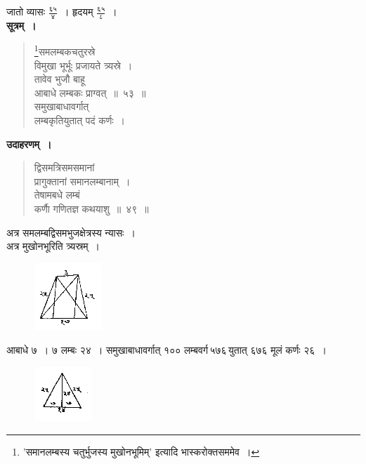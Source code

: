 \documentclass[11pt, openany]{book}
\begin{document}
 जातो व्यासः $\frac{\mbox{६५}}{\mbox{४}}$~। हृदयम् 
 $\frac{\mbox{६५}}{\mbox{८}}$~। \\

 \textbf{सूत्रम्~।} 
\setcounter{footnote}{0}
 \begin{quote}
     \bs 
      \footnote{'{\color{violet}समानलम्बस्य चतुर्भुजस्य मुखोनभूमिम्}' इत्यादि {\color{violet}भास्करो}क्तसममेव~।}समलम्बकचतुरस्रे \\
      विमुखा भूर्भूः प्रजायते त्र्यस्रे~।\\
तावेव भुजौ बाहू \\
आबाधे लम्बकः प्राग्वत्~॥~५३~॥\\
समुखाबाधावर्गात्\\
लम्बकृतियुतात् पदं कर्णः~।\\
 \end{quote}
\newpage%
 \textbf{उदाहरणम्~।} 
\begin{quote}
    \bqt 
द्विसमत्रिसमसमानां \\
प्रागुक्तानां समानलम्बानाम्~।\\
तेषामबधे लम्बं \\
कर्णाै गणितज्ञ कथयाशु~॥~४९~॥
\end{quote}
 
 अत्र समलम्बद्विसमभुजक्षेत्रस्य न्यासः~। \\
\indent अत्र मुखोनभूरिति त्र्यस्रम्~। 
\vspace{-2mm}

\begin{figure}[h!]
    \centering
    \includegraphics[scale=0.85]{graphics/capture62.png}
\end{figure}
\vspace{-2mm}

 आबाधे ७~। ७ लम्बः २४~। समुखाबाधावर्गात् १०० लम्बवर्ग\textendash \,५७६\textendash \,युतात् ६७६ मूलं कर्णः २६~। 
\vspace{-2mm}

\begin{figure}[h!]
    \centering
    \includegraphics[scale=0.85]{graphics/capture63.png}
\end{figure}
\vspace{-2mm}
\end{document}
